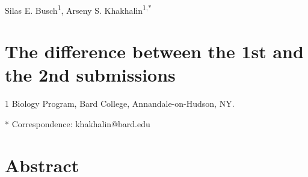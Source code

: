 \documentclass{article}
\providecommand{\DIFaddbegin}{} %
\providecommand{\DIFaddend}{} %
\newcommand{\DIFaddincludegraphics}[2][]{{\color{blue}\fbox{\DIFOincludegraphics[#1]{#2}}}} %
\DeclareRobustCommand{\DIFaddbegin}{\DIFOaddbegin \let\includegraphics\DIFaddincludegraphics} %
\DeclareRobustCommand{\DIFaddend}{\DIFOaddend \let\includegraphics\DIFOincludegraphics} %
\begin{document}


\DIFaddbegin \linenumbers %
\DIFaddend 

\begin{flushleft}
{\Large
\textbf{}
}
\newline

\\
Silas E. Busch\textsuperscript{1},
Arseny S. Khakhalin\textsuperscript{1,*}
\\

\section*{The difference between the 1st and the 2nd submissions}

\bigskip
{1} Biology Program, Bard College, Annandale-on-Hudson, NY. 

* Correspondence: khakhalin@bard.edu

\section*{Abstract}


\end{flushleft}
\end{document}
